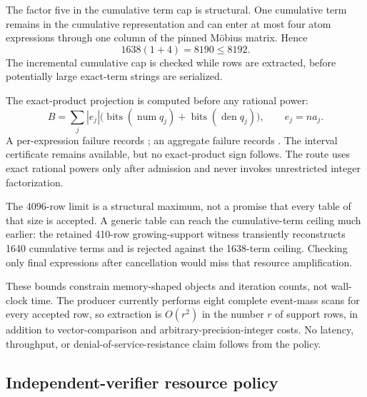 \documentclass[11pt]{article}
\theoremstyle{definition}
\begin{document}
The factor five in the cumulative term cap is structural.  One cumulative term remains in the
cumulative representation and can enter at most four atom expressions through one column of the
pinned M{\"o}bius matrix.  Hence
\begin{equation}
  1638(1+4)=8190\le8192.
\end{equation}
The incremental cumulative cap is checked while rows are extracted, before potentially large
exact-term strings are serialized.

The exact-product projection is computed before any rational power:
\begin{equation}
  B=\sum_j |e_j|\bigl(\operatorname{bits}(\operatorname{num}q_j)
    +\operatorname{bits}(\operatorname{den}q_j)\bigr),
  \qquad e_j=na_j.
\end{equation}
A per-expression failure records
; an aggregate failure records
.  The interval certificate remains available, but no
exact-product sign follows.  The route uses exact rational powers only after admission and never
invokes unrestricted integer factorization.

The 4096-row limit is a structural maximum, not a promise that every table of that size is
accepted.  A generic table can reach the cumulative-term ceiling much earlier: the retained
410-row growing-support witness transiently reconstructs 1640 cumulative terms and is rejected
against the 1638-term ceiling.  Checking only final expressions after cancellation would miss
that resource amplification.

These bounds constrain memory-shaped objects and iteration counts, not wall-clock time.  The
producer currently performs eight complete event-mass scans for every accepted row, so extraction
is \(O(r^2)\) in the number \(r\) of support rows, in addition to vector-comparison and
arbitrary-precision-integer costs.  No latency, throughput, or denial-of-service-resistance claim
follows from the policy.

\subsection{Independent-verifier resource policy}
\end{document}
